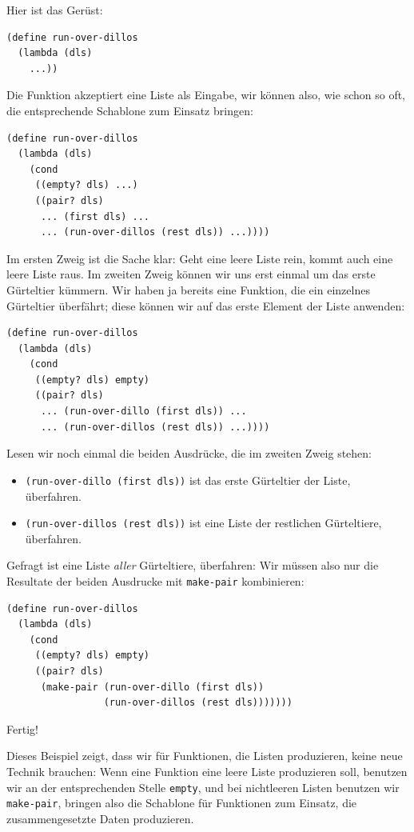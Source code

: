 Hier ist das Gerüst:
%
\begin{verbatim}
(define run-over-dillos
  (lambda (dls)
    ...))
\end{verbatim}
%
Die Funktion akzeptiert eine Liste als Eingabe, wir können also, wie
schon so oft, die entsprechende Schablone zum Einsatz bringen:
%
\begin{verbatim}
(define run-over-dillos
  (lambda (dls)
    (cond
     ((empty? dls) ...)
     ((pair? dls)
      ... (first dls) ...
      ... (run-over-dillos (rest dls)) ...))))
\end{verbatim}
%
Im ersten Zweig ist die Sache klar: Geht eine leere Liste rein, kommt
auch eine leere Liste raus.  Im zweiten Zweig können wir uns erst
einmal um das erste Gürteltier kümmern.  Wir haben ja bereits eine
Funktion, die ein einzelnes Gürteltier überfährt; diese können wir auf
das erste Element der Liste anwenden:
%
\begin{verbatim}
(define run-over-dillos
  (lambda (dls)
    (cond
     ((empty? dls) empty)
     ((pair? dls)
      ... (run-over-dillo (first dls)) ...
      ... (run-over-dillos (rest dls)) ...))))
\end{verbatim}
%
Lesen wir noch einmal die beiden Ausdrücke, die im zweiten Zweig
stehen:
%
\begin{itemize}
\item \texttt{(run-over-dillo (first dls))} ist das erste Gürteltier
  der Liste, überfahren.
\item \texttt{(run-over-dillos (rest dls))} ist eine Liste der
  restlichen Gürteltiere, überfahren.
\end{itemize}
%
Gefragt ist eine Liste \emph{aller} Gürteltiere, überfahren:
Wir müssen also nur die Resultate der beiden Ausdrucke mit
\texttt{make-pair} kombinieren:
%
\begin{verbatim}
(define run-over-dillos
  (lambda (dls)
    (cond
     ((empty? dls) empty)
     ((pair? dls)
      (make-pair (run-over-dillo (first dls))
                 (run-over-dillos (rest dls)))))))
\end{verbatim}
%
Fertig!

Dieses Beispiel zeigt, dass wir für Funktionen, die Listen produzieren,
keine neue Technik brauchen: Wenn eine Funktion eine leere Liste
produzieren soll, benutzen wir an der entsprechenden Stelle
\texttt{empty}, und bei nichtleeren Listen benutzen wir
\texttt{make-pair}, bringen also die Schablone für Funktionen zum
Einsatz, die zusammengesetzte Daten produzieren.

